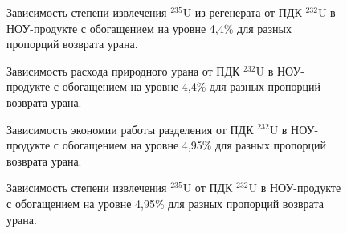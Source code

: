 % 

% 

\begin{figure}
    \centering
    \begin{minipage}{.5\textwidth}
      \centering
      
\caption{{Зависимость степени извлечения $^{235}$U из регенерата от ПДК $^{232}$U в НОУ-продукте с обогащением на уровне 4,4\% для разных пропорций возврата урана.{\label{exR44}}}}
    \end{minipage}%
    \begin{minipage}{.5\textwidth}
      \centering
      
\caption{{Зависимость расхода природного урана от ПДК $^{232}$U в НОУ-продукте с обогащением на уровне 4,4\% для разных пропорций возврата урана.{\label{F0R44}}}}
    \end{minipage}
\end{figure}


% 

% 

\begin{figure}
    \centering
    \begin{minipage}{.5\textwidth}
      \centering
      
\caption{{Зависимость экономии работы разделения от ПДК $^{232}$U в НОУ-продукте с обогащением на уровне 4,95\% для разных пропорций возврата урана.{\label{sw495}}}}
    \end{minipage}%
    \begin{minipage}{.5\textwidth}
      \centering
      
\caption{{Зависимость степени извлечения $^{235}$U от ПДК $^{232}$U в НОУ-продукте с обогащением на уровне 4,95\% для разных пропорций возврата урана.{\label{ex495}}}}
\end{minipage}
\end{figure}

